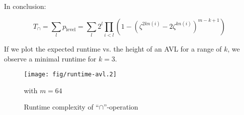         In conclusion:

        \begin{equation}
            T_{\cap} = \sum_l p_\mathrm{level} =
            \sum_l 2^l \prod_{i<l} \left(1 - \left(
                \zeta^{2kn(i)} -2\zeta^{kn(i)}
            \right)^{m-k+1} \right)
        \end{equation}

        If we plot the expected runtime vs. the height of an AVL for a range of
        $k$, we observe a minimal runtime for $k=3$.

        \begin{figure}[!h]
            \caption{Runtime complexity of ``$\cap$''-operation}
            \label{fig:parameters-AVL_bloom-runtime_intersection}
            \begin{center}
                \texttt{[image: fig/runtime-avl.2]}

                with $m=64$
            \end{center}
        \end{figure}

